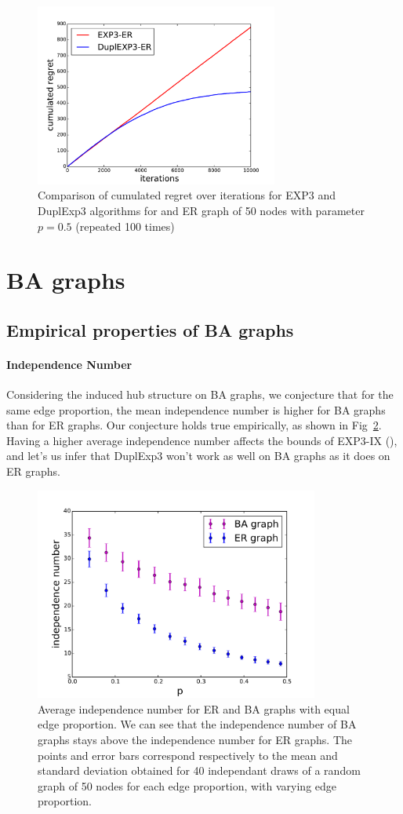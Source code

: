\documentclass[10pt,a4paper]{scrartcl}
\begin{document}
\begin{figure}[h!]
\centering
\includegraphics[height=6cm]{figures/50new_dupl_big_r05.pdf}
\caption{Comparison of cumulated regret over iterations for EXP3 and DuplExp3 algorithms for and ER graph of 50 nodes with parameter $p=0.5$ (repeated 100 times)}
\label{duplexp3vsexp3ER}
\end{figure}

\section{BA graphs}
\subsection{Empirical properties of BA graphs}
\paragraph{Independence Number}
Considering the induced hub structure on BA graphs, we conjecture that for the same edge proportion, the mean independence number is higher for BA graphs than for ER graphs.  Our conjecture holds true empirically, as shown in Fig~\ref{mean_alpha_ba_er}. Having a higher average independence number affects the bounds of EXP3-IX (\cite{kocak2014efficient}), and let's us infer that DuplExp3 won't work as well on BA graphs as it does on ER graphs.

\begin{figure}[h!]
\centering
 \includegraphics[height=7cm]{figures/independance_number_com.pdf}
 \caption{Average independence number for ER and BA graphs with equal edge proportion. We can see that the independence number of BA graphs stays above the independence number for ER graphs. The points and error bars correspond respectively to the mean and standard deviation obtained for 40 independant draws of a random graph of 50 nodes for each edge proportion, with varying edge proportion.}
 \label{mean_alpha_ba_er}
\end{figure}
\end{document}
